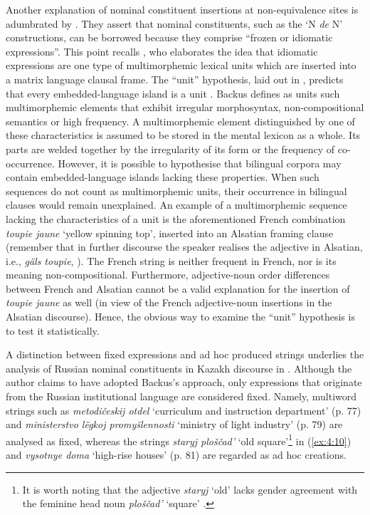 \begin{sloppypar}
Another explanation of nominal constituent insertions at non-equivalence sites is adumbrated by \citet[215]{poplack-meechan-1995}. They assert that nominal constituents, such as the `N \textit{de} N' constructions, can be borrowed because they comprise ``frozen or idiomatic expressions''. This point recalls \citet{backus-two-1996,backus-evidence-1999,backus-units-2003}, who elaborates the idea that idiomatic expressions are one type of multimorphemic lexical units which are inserted into a matrix language clausal frame. The ``unit'' hypothesis, laid out in , predicts that every embedded-language island is a unit \citep[cf.][91]{backus-units-2003}. Backus defines as units such multimorphemic elements that exhibit irregular morphosyntax, non-compositional semantics or high frequency. A multimorphemic element distinguished by one of these characteristics is assumed to be stored in the mental lexicon as a whole. Its parts are welded together by the irregularity of its form or the frequency of co-occurrence. However, it is possible to hypothesise that bilingual corpora may contain embedded-language islands lacking these properties. When such sequences do not count as multimorphemic units, their occurrence in bilingual clauses would remain unexplained. An example of a multimorphemic sequence lacking the characteristics of a unit is the aforementioned French combination \textit{toupie jaune} `yellow spinning top', inserted into an Alsatian framing clause (remember that in further discourse the speaker realises the adjective in Alsatian, i.e., \textit{gäls toupie}, \citealt[133]{gardner-chloros-1991}). The French string is neither frequent in French, nor is its meaning non-compositional. Furthermore, adjective-noun order differences between French and Alsatian cannot be a valid explanation for the insertion of \textit{toupie jaune} as well (in view of the French adjective-noun insertions in the Alsatian discourse). Hence, the obvious way to examine the ``unit'' hypothesis is to test it statistically.
\end{sloppypar}

A distinction between fixed expressions and ad hoc produced strings underlies the analysis of Russian nominal constituents in Kazakh discourse in \citet[77--88]{muhamedowa-untersuchung-2006}. Although the author claims to have adopted Backus's approach, only expressions that originate from the Russian institutional language are considered fixed. Namely, multiword strings such as \textit{metodičeskij otdel} `curriculum and instruction department' (p. 77) and  \textit{ministerstvo lëgkoj promyšlennosti} `ministry of light industry' (p. 79) are analysed as fixed, whereas the strings \textit{staryj ploščad'} `old square'\footnote{It is worth noting that the adjective \textit{staryj} `old' lacks gender agreement with the feminine head noun \textit{ploščad'} `square' \citep[82]{muhamedowa-untersuchung-2006}.} in (\ref{ex:4:10}) and \textit{vysotnye doma} `high-rise houses' (p. 81) are regarded as ad hoc creations. 

